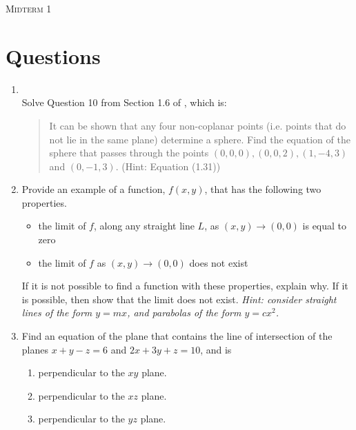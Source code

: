 \documentclass{article}
\date{}
\begin{document}
\begin{center}
\textsc{\LARGE Midterm 1}\\[0.5cm]
\end{center}
\section*{Questions}

\begin{enumerate}
\item 
{}\\
Solve Question 10 from Section 1.6 of \VCT, which is: 
\begin{quotation}
\noindent
It can be shown that any four non-coplanar points (i.e. points that do not lie in the same plane) determine a sphere. Find the equation of the sphere that passes through the points $(0, 0, 0), (0, 0, 2), (1, -4, 3)$ and $(0, -1, 3)$. (Hint: Equation (1.31))
\end{quotation}
\item 
Provide an example of a function, $f(x,y)$, that has the following two properties.
\begin{itemize}
\item the limit of $f$, along any straight line $L$, as $(x,y) \rightarrow (0,0)$ is equal to zero
\item the limit of $f$ as $(x,y) \rightarrow (0,0)$ does not exist
\end{itemize}
If it is not possible to find a function with these properties, explain why. If it is possible, then show that the limit does not exist.    \textit{Hint: consider straight lines of the form $y=mx$, and parabolas of the form $y=cx^2$.}
\item 
Find an equation of the plane that contains the line of intersection of the planes $x+y-z=6$ and $2x+3y+z=10$, and is 
\begin{enumerate}
\item perpendicular to the $xy$ plane.
\item perpendicular to the $xz$ plane.
\item perpendicular to the $yz$ plane.
\end{enumerate}

\end{enumerate}
\end{document}
